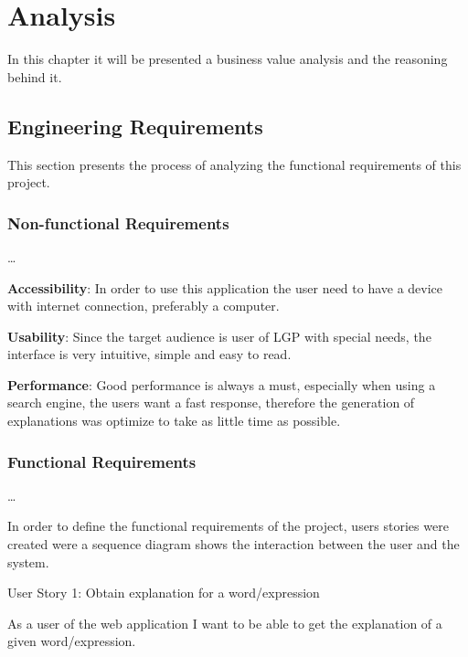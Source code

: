 
\chapter{Analysis} %
\label{chap:Chapter3} %

In this chapter it will be presented a business value analysis and the reasoning behind it.

\section{Engineering Requirements}

This section presents the process of analyzing the functional requirements of this project.

\subsection{Non-functional Requirements}

\dots %

\textbf{Accessibility}: In order to use this application the user need to have a device with internet connection, preferably a computer.

\textbf{Usability}: Since the target audience is user of \gls{LGP} with special needs, the interface is very intuitive, simple and easy to read.

\textbf{Performance}: Good performance is always a must, especially when using a search engine, the users want a fast response, therefore the generation of explanations was optimize to take as little time as possible.

\subsection{Functional Requirements}

\dots %

In order to define the functional requirements of the project, users stories were created were a sequence diagram shows the interaction between the user and the system.

User Story 1: Obtain explanation for a word/expression

As a user of the web application I want to be able to get the explanation of a given word/expression.

